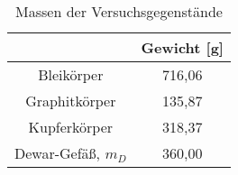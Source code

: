 \begin{table}[h]
	\begin{center}
		\begin{tabular}{cc}
			&Gewicht [g] \\ \hline
			Bleikörper&716,06\\
			Graphitkörper&135,87\\
			Kupferkörper&318,37\\
			Dewar-Gefäß, $m_D$&360,00
		\end{tabular}
		\caption{Massen der Versuchsgegenstände}
		\label{tabmassen}
	\end{center}
\end{table}